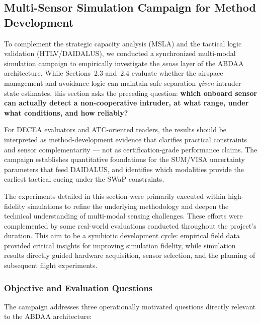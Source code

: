 \subsection{Multi-Sensor Simulation Campaign for Method Development}
\label{sec:multisensor-benchmark}

To complement the strategic capacity analysis (MSLA) and the tactical logic validation (HTLV/DAIDALUS), we conducted a synchronized multi-modal simulation campaign to empirically investigate the \emph{sense} layer of the ABDAA architecture. While Sections~2.3 and~2.4 evaluate whether the airspace management and avoidance logic can maintain safe separation \emph{given} intruder state estimates, this section asks the preceding question: \textbf{which onboard sensor can actually detect a non-cooperative intruder, at what range, under what conditions, and how reliably?}

For DECEA evaluators and ATC-oriented readers, the results should be interpreted as method-development evidence that clarifies practical constraints and sensor complementarity --- not as certification-grade performance claims. The campaign establishes quantitative foundations for the SUM/VISA uncertainty parameters that feed DAIDALUS, and identifies which modalities provide the earliest tactical cueing under the SWaP constraints.

The experiments detailed in this section were primarily executed within high-fidelity simulations to refine the underlying methodology and deepen the technical understanding of multi-modal sensing challenges. These efforts were complemented by some real-world evaluations conducted throughout the project's duration. This aim to be a symbiotic development cycle: empirical field data provided critical insights for improving simulation fidelity, while simulation results directly guided hardware acquisition, sensor selection, and the planning of subsequent flight experiments.

\subsubsection{Objective and Evaluation Questions}

The campaign addresses three operationally motivated questions directly relevant to the ABDAA architecture:

